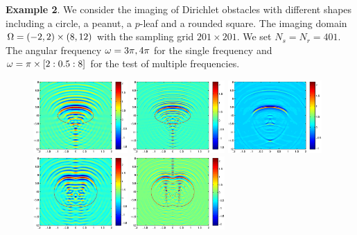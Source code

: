 \documentclass[12pt]{iopart}
\begin{document}
{\bigskip
\textbf{Example 2}. We consider the imaging of Dirichlet obstacles with different shapes including a circle, a peanut, a $p$-leaf and a rounded square. The imaging domain $\Omega = (-2, 2) \times (8, 12)$ with the sampling grid $201 \times 201$. We set $N_s = N_r = 401$. The angular frequency $\omega = 3\pi,4\pi$ for the single frequency and $\omega=\pi\times[2:0.5:8]$ for the test of multiple frequencies.

\begin{figure}
	\centering
	\includegraphics[width=0.32\textwidth]{./graphic/circle_3pi.eps}
	\includegraphics[width=0.32\textwidth]{./graphic/circle_5pi.eps}
	\includegraphics[width=0.32\textwidth]{./graphic/circle.eps}
	\includegraphics[width=0.32\textwidth]{./graphic/peanut_3pi.eps}
	\includegraphics[width=0.32\textwidth]{./graphic/peanut_5pi.eps}

\end{figure}}
\end{document}
